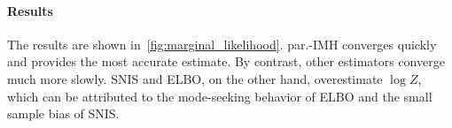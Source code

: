 \paragraph{Results}
The results are shown in~\cref{fig:marginal_likelihood}.
par.-IMH converges quickly and provides the most accurate estimate.
By contrast, other estimators converge much more slowly.
SNIS and ELBO, on the other hand, overestimate \(\log Z\), which can be attributed to the mode-seeking behavior of ELBO and the small sample bias of SNIS.


